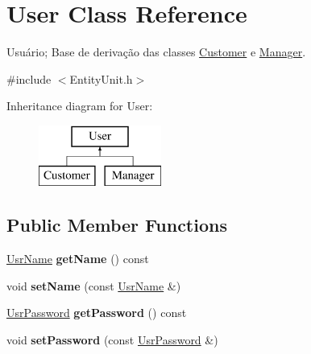 \hypertarget{classUser}{\section{User Class Reference}
\label{classUser}
}


Usuário; Base de derivação das classes \hyperlink{classCustomer}{Customer} e \hyperlink{classManager}{Manager}.  




{\ttfamily \#include $<$Entity\-Unit.\-h$>$}

Inheritance diagram for User\-:\begin{figure}[H]
\begin{center}
\leavevmode
\includegraphics[height=2.000000cm]{classUser}
\end{center}
\end{figure}
\subsection*{Public Member Functions}
\begin{DoxyCompactItemize}
\item 
\hypertarget{classUser_ae1dd9bb1a02ea1aa4246da19c28cd831}{\hyperlink{classUsrName}{Usr\-Name} {\bfseries get\-Name} () const }\label{classUser_ae1dd9bb1a02ea1aa4246da19c28cd831}

\item 
\hypertarget{classUser_a3a25b1b158ff07d1349d1d3019c7c0c0}{void {\bfseries set\-Name} (const \hyperlink{classUsrName}{Usr\-Name} \&)}\label{classUser_a3a25b1b158ff07d1349d1d3019c7c0c0}

\item 
\hypertarget{classUser_a799c61fc6ff206a1b1edbc86d61989ed}{\hyperlink{classUsrPassword}{Usr\-Password} {\bfseries get\-Password} () const }\label{classUser_a799c61fc6ff206a1b1edbc86d61989ed}

\item 
\hypertarget{classUser_a524865340fb55a6bdc983143cc82fd5d}{void {\bfseries set\-Password} (const \hyperlink{classUsrPassword}{Usr\-Password} \&)}\label{classUser_a524865340fb55a6bdc983143cc82fd5d}

\end{DoxyCompactItemize}
